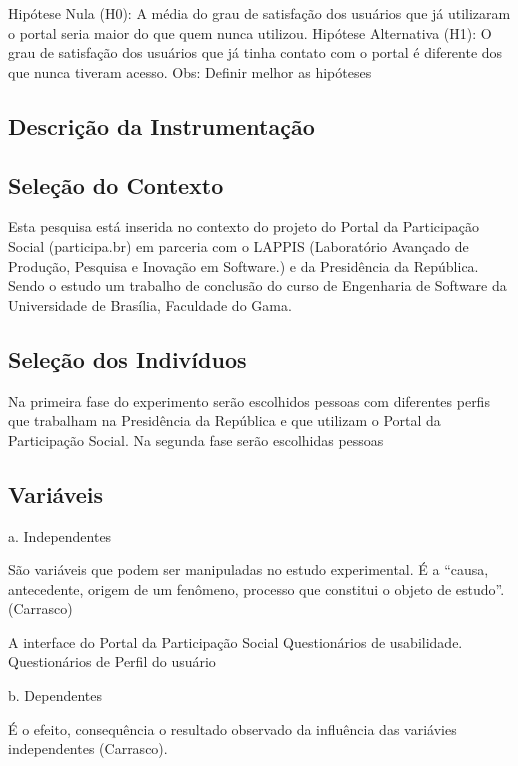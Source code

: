 Hipótese Nula (H0): A média do grau de satisfação dos usuários que já utilizaram o portal seria maior do que quem nunca utilizou.
Hipótese Alternativa (H1): O grau de satisfação dos usuários que já tinha contato com o portal é diferente dos que nunca tiveram acesso.
Obs: Definir melhor as hipóteses

\subsection{Descrição da Instrumentação}

\subsection{Seleção do Contexto}

Esta pesquisa está inserida no contexto do projeto do Portal da Participação Social (participa.br) em parceria com o LAPPIS (Laboratório Avançado de Produção, Pesquisa e Inovação em Software.) e da Presidência da República. Sendo o estudo um trabalho de conclusão do curso de Engenharia de Software da Universidade de Brasília, Faculdade do Gama.

\subsection{Seleção dos Indivíduos}

	Na primeira fase do experimento serão escolhidos pessoas com diferentes perfis que trabalham na Presidência da República e que utilizam o Portal da Participação Social.
Na segunda fase serão escolhidas pessoas 

\subsection{Variáveis}
 
a. Independentes

São variáveis que podem ser manipuladas no estudo experimental. É a “causa, antecedente, origem de um fenômeno, processo que constitui o objeto de estudo”.(Carrasco)


A interface do Portal da Participação Social
Questionários de usabilidade.
Questionários de Perfil do usuário


b. Dependentes

É o efeito, consequência o resultado observado da influência das variávies independentes (Carrasco).

